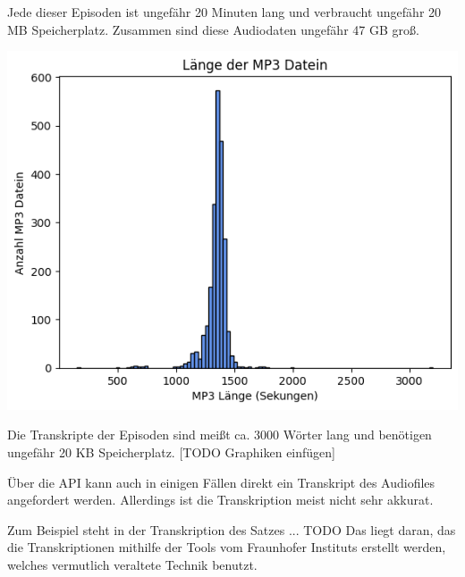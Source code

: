 Jede dieser Episoden ist ungefähr 20 Minuten lang und verbraucht ungefähr 20 MB Speicherplatz.
Zusammen sind diese Audiodaten ungefähr 47 GB groß.

\includegraphics[width=\linewidth]{figures/mp3_length.png}

Die Transkripte der Episoden sind meißt ca. 3000 Wörter lang und benötigen ungefähr 20 KB Speicherplatz. [TODO Graphiken einfügen]







Über die API kann auch in einigen Fällen direkt ein Transkript des Audiofiles angefordert werden. 
Allerdings ist die Transkription meist nicht sehr akkurat.


Zum Beispiel steht in der Transkription des Satzes ... TODO
Das liegt daran, das die Transkriptionen mithilfe der Tools vom Fraunhofer Instituts erstellt werden, welches vermutlich veraltete Technik benutzt.


